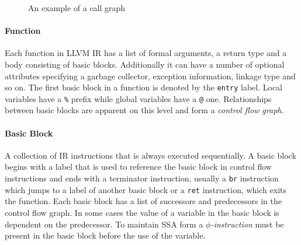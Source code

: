 \begin{figure}[H]
    \centering
    \caption{An example of a call graph}
    \label{fig_callgraph}
\end{figure}

\paragraph*{Function} Each function in {LLVM IR} has a list of formal arguments, a return type and a body consisting of basic blocks. Additionally it can have a number of optional attributes specifying a garbage collector, exception information, linkage type and so on. The first basic block in a function is denoted by the \texttt{entry} label. Local variables have a \texttt{\%} prefix while global variables have a \texttt{@} one. Relationships between basic blocks are apparent on this level and form a \emph{control flow graph}.

\paragraph*{Basic Block} A collection of IR instructions that is always executed sequentially. A basic block begins with a label that is used to reference the basic block in control flow instructions and ends with a terminator instruction, usually a \texttt{br} instruction which jumps to a label of another basic block or a \texttt{ret} instruction, which exits the function. Each basic block has a list of successors and predecessors in the control flow graph. In some cases the value of a variable in the basic block is dependent on the predecessor. To maintain SSA form a \emph{$\phi$-instruction} must be present in the basic block before the use of the variable.

